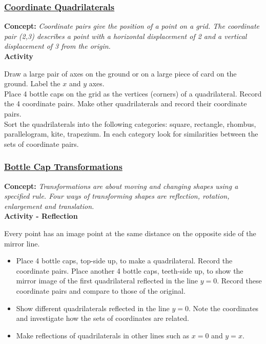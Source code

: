 		\subsubsection{\underline{Coordinate Quadrilaterals}}
		\textbf{Concept:} \emph{Coordinate pairs give the position of a point on a grid. The coordinate pair (2,3) describes a point with a horizontal displacement of 2 and a vertical displacement of 3 from the origin.}\\
		
		\noindent \textbf{Activity}
		
		\noindent Draw a large pair of axes on the ground or on a large piece of card on the ground. Label the $x$ and $y$ axes.\\
		
		\noindent Place 4 bottle caps on the grid as the vertices (corners) of a quadrilateral. Record the 4 coordinate pairs. Make other quadrilaterals and record their coordinate pairs.\\
		
		\noindent Sort the quadrilaterals into the following categories: square, rectangle, rhombus, parallelogram, kite, trapezium. In each category look for similarities between the sets of coordinate pairs.		
		
		\subsubsection{\underline{Bottle Cap Transformations}}
		\textbf{Concept:} \emph{Transformations are about moving and changing shapes using a specified rule. Four ways of transforming shapes are reflection, rotation, enlargement and translation.}\\
		
		\noindent \textbf{Activity - Reflection}
		
		\noindent Every point has an image point at the same distance on the opposite side of the mirror line.
		\begin{itemize}
		
	\item Place 4 bottle caps, top-side up, to make a quadrilateral. Record the coordinate pairs. Place another 4 bottle caps, teeth-side up, to show the mirror image of the first quadrilateral reflected in the line $y = 0$. Record these coordinate pairs and compare to those of the original.	
	\item Show different quadrilaterals reflected in the line $y = 0$. Note the coordinates and investigate how the sets of coordinates are related.
	\item Make reflections of quadrilaterals in other lines such as $x = 0$ and $y = x$.	
		\end{itemize}
		
